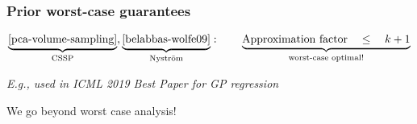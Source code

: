 \documentclass{beamer}
\begin{document}
\begin{frame}
  \frametitle{Prior worst-case guarantees}
  \vspace{-3mm}
  \onslide<+->
  \begin{align*}
    \underbrace{\text{\cite{pca-volume-sampling}}}_{\text{CSSP}},
    \underbrace{\text{\cite{belabbas-wolfe09}}}_{\text{Nystr\"om}}:\qquad
    \underbrace{\text{Approximation
    factor}\quad
\leq\quad k+1}_{\text{worst-case optimal!}} %
  \end{align*}
  \vspace{1mm}
  
  \textit{\small E.g., used in ICML 2019 Best Paper \cite{sparse-variational-gp} for GP regression}\\[1mm]
  
  \centering
  
  We go beyond worst case analysis!
\end{frame}
\end{document}
